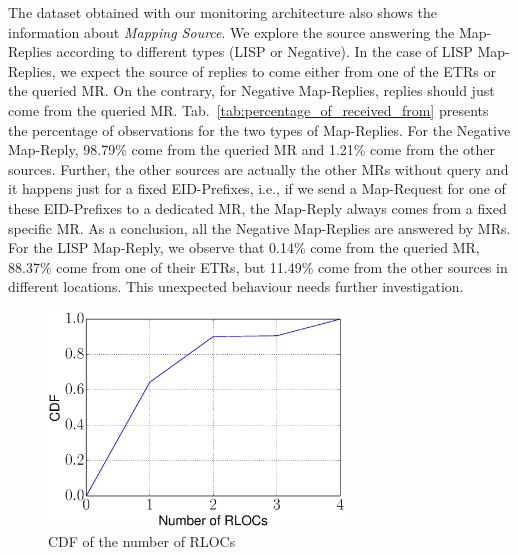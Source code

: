 \begin{table}[!t]
    \centering
    \caption{Percentage of Mapping Source}%
    \label{tab:percentage_of_received_from}{
	}
\end{table}

The dataset obtained with our monitoring architecture also shows the
information about \emph{Mapping Source}. We explore the source answering the
Map-Replies according to different types (LISP or Negative). In the case of
LISP Map-Replies, we expect the source of replies to come either from one of
the ETRs or the queried MR. On the contrary, for Negative Map-Replies, replies
should just come from the queried MR. Tab.~\ref{tab:percentage_of_received_from} presents the percentage of
observations for the two types of Map-Replies. For the Negative Map-Reply,
98.79\% come from the queried MR and 1.21\% come from the other sources.
Further, the other sources are actually the other MRs without query and it
happens just for a fixed EID-Prefixes, i.e., if we send a Map-Request for one
of these EID-Prefixes to a dedicated MR, the Map-Reply always comes from a
fixed specific MR. As a conclusion, all the Negative Map-Replies are answered
by MRs. For the LISP Map-Reply, we observe that 0.14\% come from the queried
MR, 88.37\% come from one of their ETRs, but 11.49\% come from the other
sources in different locations. This unexpected behaviour needs further
investigation.

\begin{figure}[!t]
        \centering
        \includegraphics[width=0.7\textwidth]{Pics/CDF_of_RLOCs.eps}
        \caption{CDF of the number of RLOCs}
        \label{CDF_of_RLOCs}
\end{figure}

